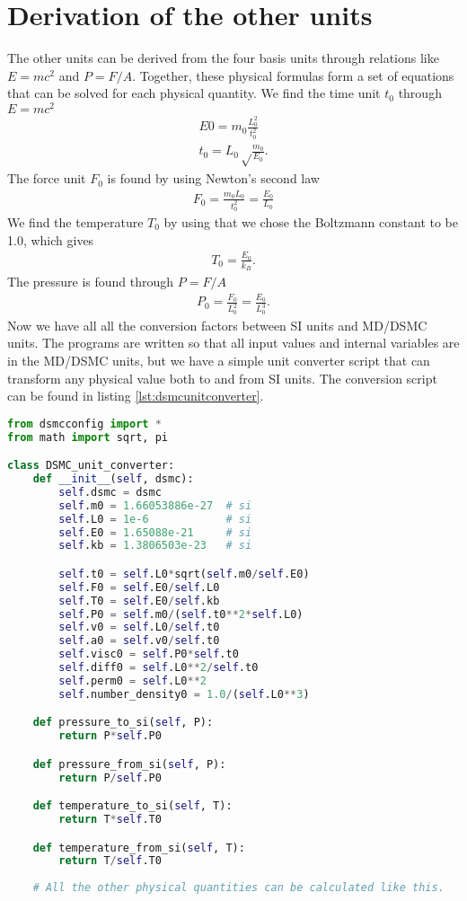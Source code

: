 \section{Derivation of the other units}
The other units can be derived from the four basis units through relations like $E=mc^2$ and $P=F/A$. Together, these physical formulas form a set of equations that can be solved for each physical quantity. We find the time unit $t_0$ through $E=mc^2$
\begin{align}
	E0 = m_0\frac{L_0^2}{t_0^2}\\
	t_0 = L_0\sqrt\frac{m_0}{E_0}.
\end{align}
The force unit $F_0$ is found by using Newton's second law
\begin{align}
	F_0 = \frac{m_0L_0}{t_0^2} = \frac{E_0}{L_0}
\end{align}
We find the temperature $T_0$ by using that we chose the Boltzmann constant to be 1.0, which gives
\begin{align}
	T_0 = \frac{E_0}{k_B}.
\end{align}
The pressure is found through $P=F/A$ 
\begin{align}
	P_0 = \frac{F_0}{L_0^2} = \frac{E_0}{L_0^3}.
\end{align}
Now we have all all the conversion factors between SI units and MD/DSMC units. The programs are written so that all input values and internal variables are in the MD/DSMC units, but we have a simple unit converter script that can transform any physical value both to and from SI units. The conversion script can be found in listing \ref{lst:dsmcunitconverter}.
\begin{lstlisting}[caption=dsmcUnitConverter.py, label=lst:dsmcunitconverter, language=Python]
from dsmcconfig import *
from math import sqrt, pi

class DSMC_unit_converter:
	def __init__(self, dsmc):
		self.dsmc = dsmc
		self.m0 = 1.66053886e-27  # si
		self.L0 = 1e-6            # si
		self.E0 = 1.65088e-21     # si
		self.kb = 1.3806503e-23   # si

		self.t0 = self.L0*sqrt(self.m0/self.E0)
		self.F0 = self.E0/self.L0
		self.T0 = self.E0/self.kb
		self.P0 = self.m0/(self.t0**2*self.L0)
		self.v0 = self.L0/self.t0
		self.a0 = self.v0/self.t0
		self.visc0 = self.P0*self.t0
		self.diff0 = self.L0**2/self.t0
		self.perm0 = self.L0**2
		self.number_density0 = 1.0/(self.L0**3)

	def pressure_to_si(self, P): 
		return P*self.P0

	def pressure_from_si(self, P): 
		return P/self.P0

	def temperature_to_si(self, T):
		return T*self.T0

	def temperature_from_si(self, T):
		return T/self.T0
	
	# All the other physical quantities can be calculated like this.
\end{lstlisting}